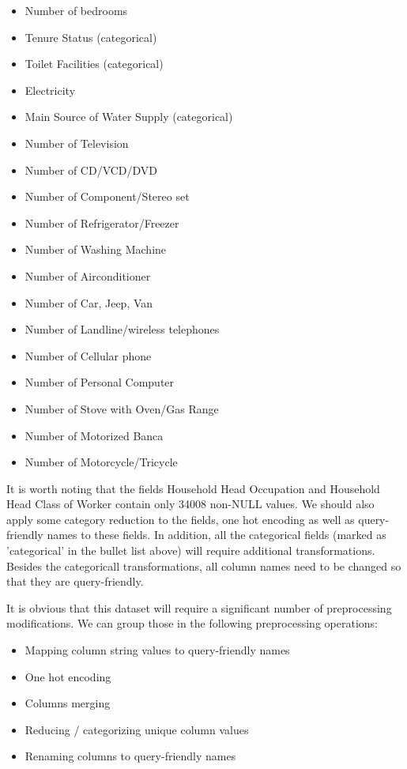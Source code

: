 \documentclass{article}
\begin{document}
\begin{itemize}
\begin{multicols}{2}
\begin{itemize}
        \item Number of bedrooms
        \item Tenure Status (categorical)
        \item Toilet Facilities (categorical)
        \item Electricity
        \item Main Source of Water Supply (categorical)
        \item Number of Television
        \item Number of CD/VCD/DVD
        \item Number of Component/Stereo set
        \item Number of Refrigerator/Freezer
        \item Number of Washing Machine
        \item Number of Airconditioner
        \item Number of Car, Jeep, Van
        \item Number of Landline/wireless telephones
        \item Number of Cellular phone
        \item Number of Personal Computer
        \item Number of Stove with Oven/Gas Range
        \item Number of Motorized Banca
        \item Number of Motorcycle/Tricycle
      \end{itemize}
    \end{multicols}
\end{itemize}

It is worth noting that the fields Household Head Occupation and Household Head Class of Worker contain only 34008 non-NULL values. We should also apply some category reduction to the fields, one hot encoding as well as query-friendly names to these fields. In addition, all the categorical fields (marked as 'categorical' in the bullet list above) will require additional transformations. Besides the categoricall transformations, all column names need to be changed so that they are query-friendly.

It is obvious that this dataset will require a significant number of preprocessing modifications. We can group those in the following preprocessing operations:

\begin{itemize}
  \item Mapping column string values to query-friendly names
  \item One hot encoding
  \item Columns merging
  \item Reducing / categorizing unique column values
  \item Renaming columns to query-friendly names
\end{itemize}
\end{document}

